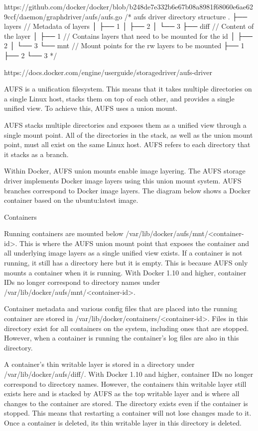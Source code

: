 https://github.com/docker/docker/blob/b248de7e332b6e67b08a8981f68060e6ae629ccf/daemon/graphdriver/aufs/aufs.go
/*
aufs driver directory structure
  .
  ├── layers // Metadata of layers
  │   ├── 1
  │   ├── 2
  │   └── 3
  ├── diff  // Content of the layer
  │   ├── 1  // Contains layers that need to be mounted for the id
  │   ├── 2
  │   └── 3
  └── mnt    // Mount points for the rw layers to be mounted
      ├── 1
      ├── 2
      └── 3
*/




https://docs.docker.com/engine/userguide/storagedriver/aufs-driver

AUFS is a unification filesystem. This means that it takes multiple directories on a single Linux host, stacks them on top of each other, and provides a single unified view. To achieve this, AUFS uses a union mount.

AUFS stacks multiple directories and exposes them as a unified view through a single mount point. All of the directories in the stack, as well as the union mount point, must all exist on the same Linux host. AUFS refers to each directory that it stacks as a branch.

Within Docker, AUFS union mounts enable image layering. The AUFS storage driver implements Docker image layers using this union mount system. AUFS branches correspond to Docker image layers. The diagram below shows a Docker container based on the ubuntu:latest image.

Containers

Running containers are mounted below /var/lib/docker/aufs/mnt/<container-id>. This is where the AUFS union mount point that exposes the container and all underlying image layers as a single unified view exists. If a container is not running, it still has a directory here but it is empty. This is because AUFS only mounts a container when it is running. With Docker 1.10 and higher, container IDs no longer correspond to directory names under /var/lib/docker/aufs/mnt/<container-id>.

Container metadata and various config files that are placed into the running container are stored in /var/lib/docker/containers/<container-id>. Files in this directory exist for all containers on the system, including ones that are stopped. However, when a container is running the container’s log files are also in this directory.

A container’s thin writable layer is stored in a directory under /var/lib/docker/aufs/diff/. With Docker 1.10 and higher, container IDs no longer correspond to directory names. However, the containers thin writable layer still exists here and is stacked by AUFS as the top writable layer and is where all changes to the container are stored. The directory exists even if the container is stopped. This means that restarting a container will not lose changes made to it. Once a container is deleted, its thin writable layer in this directory is deleted.



